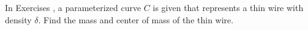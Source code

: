 {\noindent In Exercises}
{, a parameterized curve $C$ is given that represents a thin wire with density $\delta$. Find the mass and center of mass of the thin wire.}
